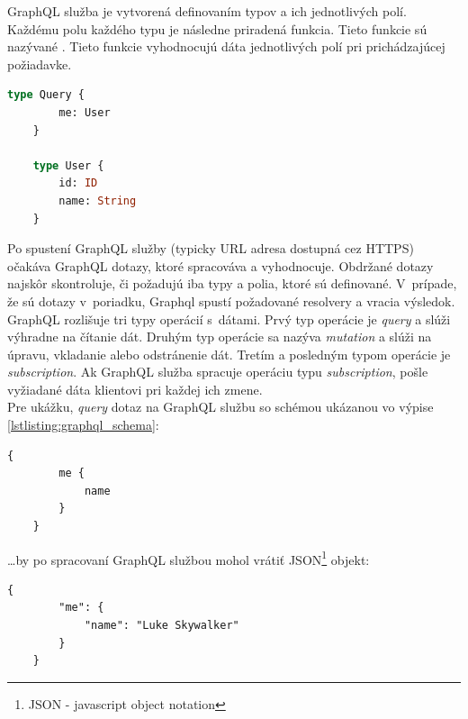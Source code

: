 \noindent GraphQL služba je vytvorená definovaním typov a ich jednotlivých polí. Každému polu každého typu je následne priradená funkcia. \cite{GraphQL} Tieto funkcie sú nazývané . Tieto funkcie vyhodnocujú dáta jednotlivých polí pri prichádzajúcej požiadavke. \\

\begin{lstlisting}[label=lstlisting:graphql_schema, language=GraphQL, caption=Príklad jednoduchej GraphQL schémy. \cite{GraphQL}]
	type Query {
		me: User
	}

	type User {
		id: ID
		name: String
	}
\end{lstlisting}

\bigskip

\noindent Po spustení GraphQL služby (typicky URL adresa dostupná cez HTTPS) očakáva GraphQL dotazy, ktoré spracováva a vyhodnocuje. Obdržané dotazy najskôr skontroluje, či požadujú iba typy a polia, ktoré sú definované. V~prípade, že sú dotazy v~poriadku, Graphql spustí požadované resolvery a vracia výsledok. \cite{GraphQL} \\

\noindent GraphQL rozlišuje tri typy operácií s~dátami. Prvý typ operácie je \emph{query} a slúži výhradne na čítanie dát. Druhým typ operácie sa nazýva \emph{mutation} a slúži na úpravu, vkladanie alebo odstránenie dát. Tretím a posledným typom operácie je \emph{subscription}. Ak GraphQL služba spracuje operáciu typu \emph{subscription}, pošle vyžiadané dáta klientovi pri každej ich zmene. \\

\noindent Pre ukážku, \emph{query} dotaz na GraphQL službu so schémou ukázanou vo výpise \ref{lstlisting:graphql_schema}: \\

\begin{lstlisting}[caption=Príklad \emph{query} dotazu na GraphQL službu. \cite{GraphQL}]
	{
		me {
			name
		}
	}
\end{lstlisting}

\bigskip

\ldots by po spracovaní GraphQL službou mohol vrátiť JSON\footnote{JSON - javascript object notation} objekt: \\

\begin{lstlisting}[caption=Príklad dát obdržaných z~GraphQL služby. \cite{GraphQL}]
	{
		"me": {
			"name": "Luke Skywalker"
		}
	}
\end{lstlisting}

